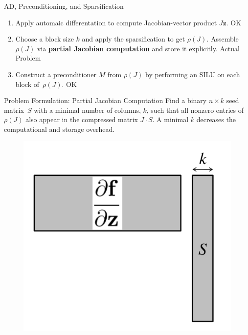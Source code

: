 \documentclass{beamer}
\newcommand{\vek}[1]{{\ensuremath{\mathbf #1}}}
\newcommand{\sparsifysymbol}{\ensuremath{\rho}}
\newcommand{\sparsify}[1]{\ensuremath{\sparsifysymbol(#1)}}
\begin{document}
\begin{frame}{AD, Preconditioning, and Sparsification}

\begin{enumerate}
  \item Apply automaic differentation to compute Jacobian-vector product $J \vek{z}$. {\color{green} OK}
  \item Choose a block size $k$ and apply the sparsification to get \sparsify{J}. Assemble \sparsify{J} via \textbf{partial Jacobian computation} and store it explicitly. {\color{red} Actual Problem}
  \item Construct a preconditioner $M$ from \sparsify{J} by performing an SILU on each block of~\sparsify{J}. {\color{green} OK}
\end{enumerate}
\end{frame}


\begin{frame}{Problem Formulation: Partial Jacobian Computation}
Find a binary $n \times k$ seed matrix~$S$ with a minimal number of columns, $k$, such
that all nonzero entries of \sparsify{J} also appear in the compressed matrix $J \cdot S$.
A minimal $k$ decreases the computational and storage overhead.

\begin{figure}
\includegraphics[width=0.5\linewidth]{minimizek}
\end{figure}
\end{frame}
\end{document}
